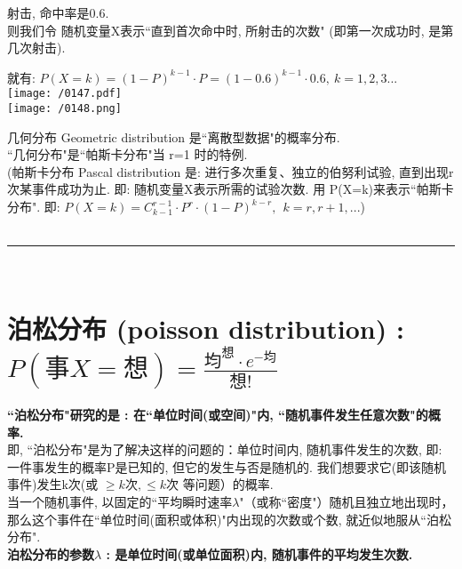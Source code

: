 \documentclass[UTF8]{ctexart}
\begin{document}
	\begin{myEnvSample}
		射击, 命中率是0.6. \\
		则我们令 随机变量X表示``直到首次命中时, 所射击的次数" (即第一次成功时, 是第几次射击). 
		
		就有: $
		P\left( X=k \right) =\left( 1-P \right) ^{k-1}\cdot P=\left( 1-0.6 \right) ^{k-1}\cdot 0.6,\ k=1,2,3...
		$ \\
		
		\texttt{[image: /0147.pdf]} \\
		
		\texttt{[image: /0148.png]} \\
	\end{myEnvSample}
	
	
	
	
	几何分布 Geometric distribution 是``离散型数据"的概率分布. \\
	``几何分布"是``帕斯卡分布"当 r=1 时的特例. \\
	 (帕斯卡分布 Pascal distribution 是: 进行多次重复、独立的伯努利试验, 直到出现r次某事件成功为止. 即: 随机变量X表示所需的试验次数. 用 P(X=k)来表示``帕斯卡分布". 即: $P\left( X=k \right) =C_{k-1}^{r-1}\cdot P^r\cdot \left( 1-P \right) ^{k-r},\ \ k=r,r+1,...$) \\
	
	
	
	
	
	
	
	
	
	~\\
	\hrule
	~\\
	
	\section{泊松分布 (poisson distribution) : $	P\left( \text{事}X=\text{想} \right) =\frac{\text{均}^{\text{想}}\cdot e^{-\text{均}}}{\text{想!}}	$}
	
	\textbf{``泊松分布"研究的是 : 在``单位时间(或空间)"内, ``随机事件发生任意次数"的概率.} \\
	
	即, ``泊松分布"是为了解决这样的问题的：单位时间内, 随机事件发生的次数, 即: 一件事发生的概率P是已知的, 但它的发生与否是随机的. 我们想要求它(即该随机事件)发生k次(或 $\geq k \text{次}, \leq k \text{次}$  等问题）的概率. \\
	
	当一个随机事件, 以固定的``平均瞬时速率$\lambda$"（或称``密度"）随机且独立地出现时，那么这个事件在``单位时间(面积或体积)"内出现的次数或个数, 就近似地服从``泊松分布". \\
	\textbf{泊松分布的参数$\lambda$ : 是单位时间(或单位面积)内, 随机事件的平均发生次数.} \\
	
\end{document}
